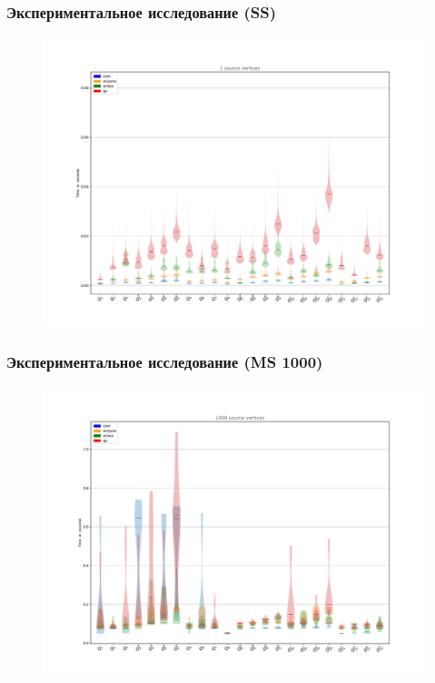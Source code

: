\documentclass{beamer}
\begin{document}
\begin{frame}[fragile]
  \frametitle{Экспериментальное исследование (SS)}
  \noindent\begin{minipage}{0.95\textwidth}
  \begin{figure}[h!]
      \includegraphics[width=1\linewidth]{pictures/ss1.pdf}
  \end{figure}
\end{minipage}
\end{frame}

\begin{frame}[fragile]
  \frametitle{Экспериментальное исследование (MS 1000)}
  \noindent\begin{minipage}{0.95\textwidth}
  \begin{figure}[h!]
      \includegraphics[width=1\linewidth]{pictures/ms1000.pdf}
  \end{figure}
\end{minipage}
\end{frame}
\end{document}

